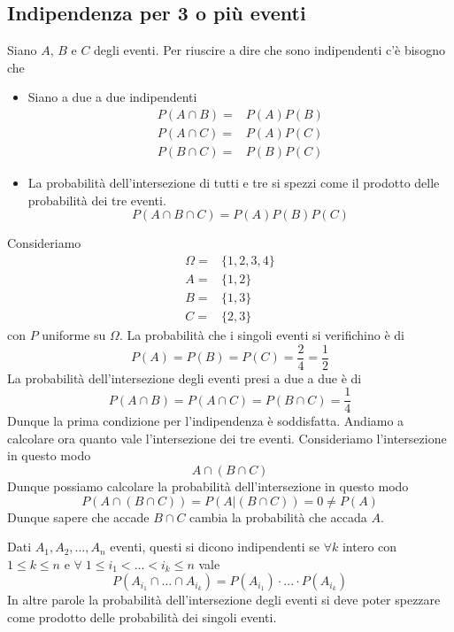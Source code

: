 \subsection{Indipendenza per 3 o più eventi}
Siano $A$, $B$ e $C$ degli eventi. Per riuscire a dire che sono indipendenti c'è bisogno che
\begin{itemize}
	\item Siano a due a due indipendenti 
		\begin{align*}
			P(A \cap B) = & P(A) P(B) \\
			P(A \cap C) = & P(A) P(C) \\
			P(B \cap C) = & P(B) P(C)
		\end{align*}
	\item La probabilità dell'intersezione di tutti e tre si spezzi come il prodotto delle
		probabilità dei tre eventi.
		\[ P(A \cap B \cap C) = P(A) P(B) P(C) \]
\end{itemize}

\begin{example}
	Consideriamo 
	\begin{align*}
		\Omega = & \{ 1, 2, 3, 4 \} \\
		A = & \{ 1, 2 \} \\
		B = & \{ 1, 3 \} \\
		C = & \{ 2, 3 \}
	\end{align*}
	con $P$ uniforme su $\Omega$. La probabilità che i singoli eventi si verifichino è di 
	\[ P(A) = P(B) = P(C) = \frac{2}{4} = \frac{1}{2} \]
	La probabilità dell'intersezione degli eventi presi a due a due è di
	\[ P(A \cap B) = P(A \cap C) = P(B \cap C) = \frac{1}{4} \]
	Dunque la prima condizione per l'indipendenza è soddisfatta. Andiamo a calcolare ora quanto 
	vale l'intersezione dei tre eventi. Consideriamo l'intersezione in questo modo
	\[ A \cap (B \cap C) \]
	Dunque possiamo calcolare la probabilità dell'intersezione in questo modo 
	\[ P(A \cap (B \cap C)) = P(A | (B \cap C)) = 0 \neq P(A) \]
	Dunque sapere che accade $B \cap C$ cambia la probabilità che accada $A$.
\end{example}

\begin{definition}
	Dati $A_1, A_2, ..., A_n$ eventi, questi si dicono indipendenti se $\forall k$ intero con 
	$1 \leq k \leq n$ e $\forall \; 1 \leq i_1 < ... < i_k \leq n$ vale
	\[ P(A_{i_1} \cap ... \cap A_{i_k}) = P(A_{i_1}) \cdot ... \cdot P(A_{i_k}) \]
	In altre parole la probabilità dell'intersezione degli eventi si deve poter spezzare come
	prodotto delle probabilità dei singoli eventi.
\end{definition}

